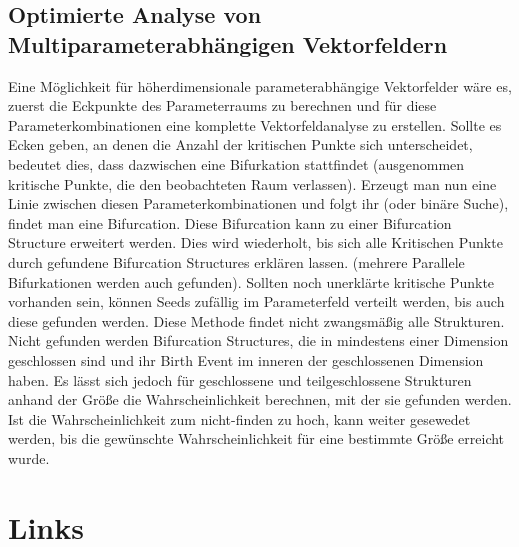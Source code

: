 \documentclass[11pt]{article}
\begin{document}
\subsection{Optimierte Analyse von Multiparameterabhängigen Vektorfeldern}
Eine Möglichkeit für höherdimensionale parameterabhängige Vektorfelder wäre es, zuerst die Eckpunkte des Parameterraums zu berechnen und für diese Parameterkombinationen eine komplette Vektorfeldanalyse zu erstellen.
Sollte es Ecken geben, an denen die Anzahl der kritischen Punkte sich unterscheidet, bedeutet dies, dass dazwischen eine Bifurkation stattfindet (ausgenommen kritische Punkte, die den beobachteten Raum verlassen). Erzeugt man nun eine Linie zwischen diesen Parameterkombinationen und folgt ihr (oder binäre Suche), findet man eine Bifurcation. Diese Bifurcation kann zu einer Bifurcation Structure erweitert werden. Dies wird wiederholt, bis sich alle Kritischen Punkte durch gefundene Bifurcation Structures erklären lassen. (mehrere Parallele Bifurkationen werden auch gefunden). Sollten noch unerklärte kritische Punkte vorhanden sein, können Seeds zufällig im Parameterfeld verteilt werden, bis auch diese gefunden werden.
Diese Methode findet nicht zwangsmäßig alle Strukturen. Nicht gefunden werden Bifurcation Structures, die in mindestens einer Dimension geschlossen sind und ihr Birth Event im inneren der geschlossenen Dimension haben. Es lässt sich jedoch für geschlossene und teilgeschlossene Strukturen anhand der Größe die Wahrscheinlichkeit berechnen, mit der sie gefunden werden. Ist die Wahrscheinlichkeit zum nicht-finden zu hoch, kann weiter gesewedet werden, bis die gewünschte Wahrscheinlichkeit für eine bestimmte Größe erreicht wurde. 








\pagebreak
\section{Links}








\end{document}
